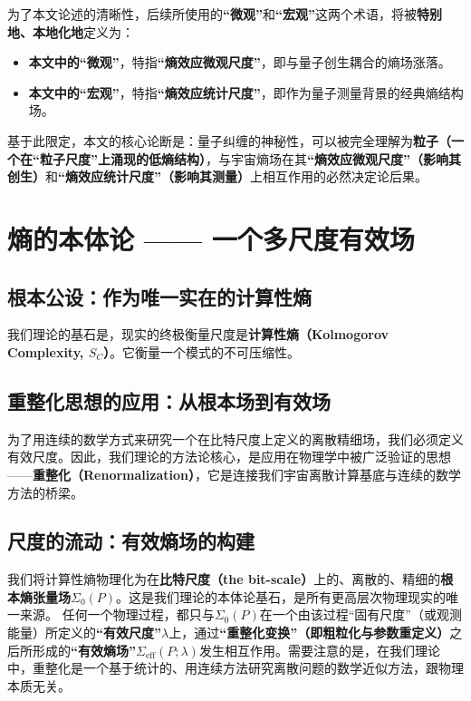 \documentclass[12pt]{article}
\begin{document}
为了本文论述的清晰性，后续所使用的\textbf{``微观''}和\textbf{``宏观''}这两个术语，将被\textbf{特别地、本地化地}定义为：
\begin{itemize}
    \item   \textbf{本文中的``微观''}，特指\textbf{``熵效应微观尺度''}，即与量子创生耦合的熵场涨落。
    \item   \textbf{本文中的``宏观''}，特指\textbf{``熵效应统计尺度''}，即作为量子测量背景的经典熵结构场。
\end{itemize}

\noindent 基于此限定，本文的核心论断是：量子纠缠的神秘性，可以被完全理解为\textbf{粒子（一个在``粒子尺度''上涌现的低熵结构）}，与宇宙熵场在其\textbf{``熵效应微观尺度''（影响其创生）}和\textbf{``熵效应统计尺度''（影响其测量）}上相互作用的必然决定论后果。



\section{熵的本体论 —— 一个多尺度有效场}

\subsection{根本公设：作为唯一实在的计算性熵}
我们理论的基石是，现实的终极衡量尺度是\textbf{计算性熵（Kolmogorov Complexity, $S_C$）}。它衡量一个模式的不可压缩性。

\subsection{重整化思想的应用：从根本场到有效场}
为了用连续的数学方式来研究一个在比特尺度上定义的离散精细场，我们必须定义有效尺度。因此，我们理论的方法论核心，是应用在物理学中被广泛验证的思想——\textbf{重整化（Renormalization）}，它是连接我们宇宙离散计算基底与连续的数学方法的桥梁。

\subsection{尺度的流动：有效熵场的构建}
我们将计算性熵物理化为在\textbf{比特尺度（the bit-scale）}上的、离散的、精细的\textbf{根本熵张量场$\Sigma_0(P)$}。这是我们理论的本体论基石，是所有更高层次物理现实的唯一来源。
任何一个物理过程，都只与$\Sigma_0(P)$在一个由该过程``固有尺度''（或观测能量）所定义的\textbf{``有效尺度''$\lambda$}上，通过\textbf{``重整化变换''（即粗粒化与参数重定义）}之后所形成的\textbf{``有效熵场''$\Sigma_{\text{eff}}(P; \lambda)$}发生相互作用。需要注意的是，在我们理论中，重整化是一个基于统计的、用连续方法研究离散问题的数学近似方法，跟物理本质无关。
\end{document}

